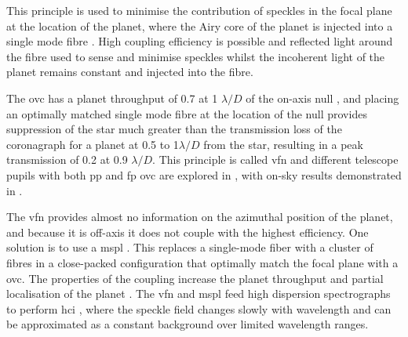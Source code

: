 \documentclass[letterpaper]{ar-1col}
\newcommand{\ld}{$\lambda/D$}
\begin{document}
This principle is used to minimise the contribution of speckles in the focal plane at the location of the planet, where the Airy core of the planet is injected into a single mode fibre \citep{Mawet17}.
%
High coupling efficiency is possible \citep[with a theoretical maximum of 81\% for an Airy core into the Gaussian HE$_{11}$ mode; ][]{shaklan1988coupling} and reflected light around the fibre used to sense and minimise speckles whilst the incoherent light of the planet remains constant and injected into the fibre. 

The \ac{ovc} has a planet throughput of 0.7 at 1 \ld{} of the on-axis null \citep{Mawet05b}, and placing an optimally matched single mode fibre at the location of the null provides suppression of the star much greater than the transmission loss of the coronagraph for a planet at 0.5 to 1\ld{} from the star, resulting in a peak transmission of 0.2 at 0.9 \ld{}.
%
This principle is called \acl{vfn} \citep[\acs{vfn}; ][]{Ruane18} and different telescope pupils with both \ac{pp} and \ac{fp} \ac{ovc} are explored in \citet{Ruane19}, with on-sky results demonstrated in \citet{Echeverri24}.

The \ac{vfn} provides almost no information on the azimuthal position of the planet, and because it is off-axis it does not couple with the highest efficiency.
%
One solution is to use a \acl{mspl} \citep[\acs{mspl}; ][]{LeonSaval13}.
%
This replaces a single-mode fiber with a cluster of fibres in a close-packed configuration that optimally match the focal plane with a \ac{ovc}.
%
The properties of the coupling increase the planet throughput and partial localisation of the planet \citep{Xin22}.
%
The \ac{vfn} and \ac{mspl} feed high dispersion spectrographs to perform \ac{hci} \citep[][ and this Review]{Snellen15}, where the speckle field changes slowly with wavelength and can be approximated as a constant background over limited wavelength ranges.
\end{document}
